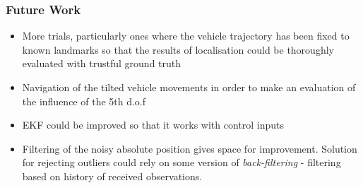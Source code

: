 \begin{frame}\frametitle{Future Work}
\begin{itemize}
\item More trials, particularly ones where the vehicle trajectory has been fixed to known landmarks so that the results of localisation could be thoroughly evaluated with trustful ground truth
%
\item Navigation of the tilted vehicle movements in order to make an evaluation of the influence of the 5th d.o.f

\item EKF could be improved so that it works with control inputs
\item Filtering of the noisy absolute position gives space for improvement. Solution for rejecting outliers could rely on some version of \textit{back-filtering} - filtering based on history of received observations.%


\end{itemize} 
\end{frame}